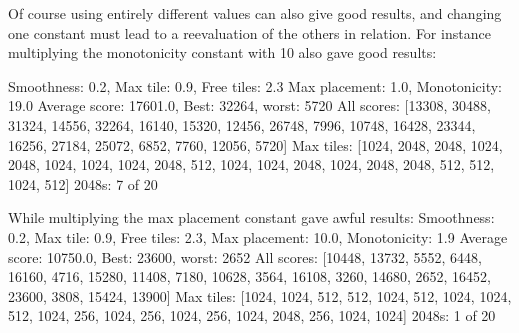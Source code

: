Of course using entirely different values can also give good results, and changing one
constant must lead to a reevaluation of the others in relation. For instance multiplying
the monotonicity constant with 10 also gave good results:

Smoothness: 0.2, Max tile: 0.9, Free tiles: 2.3 Max placement: 1.0, Monotonicity: 19.0
Average score: 17601.0, Best: 32264, worst: 5720
All scores: [13308, 30488, 31324, 14556, 32264, 16140, 15320, 12456, 26748, 7996, 10748, 16428, 23344, 16256, 27184, 25072, 6852, 7760, 12056, 5720]
Max tiles: [1024, 2048, 2048, 1024, 2048, 1024, 1024, 1024, 2048, 512, 1024, 1024, 2048, 1024, 2048, 2048, 512, 512, 1024, 512]
2048s: 7 of 20

While multiplying the max placement constant gave awful results:
Smoothness: 0.2, Max tile: 0.9, Free tiles: 2.3, Max placement: 10.0, Monotonicity: 1.9
Average score: 10750.0, Best: 23600, worst: 2652
All scores: [10448, 13732, 5552, 6448, 16160, 4716, 15280, 11408, 7180, 10628, 3564, 16108, 3260, 14680, 2652, 16452, 23600, 3808, 15424, 13900]
Max tiles: [1024, 1024, 512, 512, 1024, 512, 1024, 1024, 512, 1024, 256, 1024, 256, 1024, 256, 1024, 2048, 256, 1024, 1024]
2048s: 1 of 20
